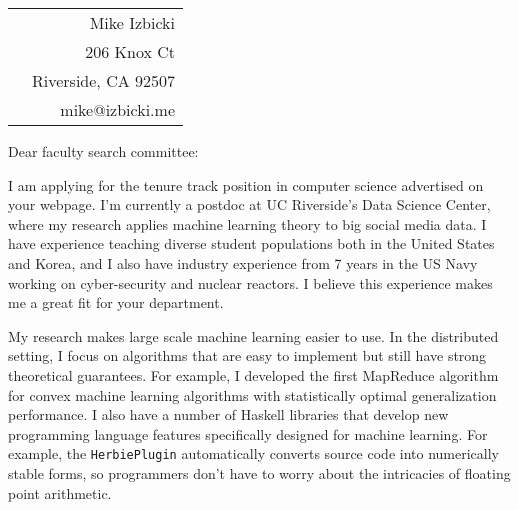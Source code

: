 \documentclass[12pt]{article}
\begin{document}
\noindent
\hspace{-0.13in}
\begin{tabularx}{1.03\textwidth}{Xr}
 & Mike Izbicki \\
 & 206 Knox Ct\\
 & Riverside, CA 92507\\
 & mike@izbicki.me\\
\end{tabularx}

\vspace{0.2in}

\setlength{\parskip}{15pt plus4mm minus3mm}

\noindent
Dear faculty search committee:

\noindent
I am applying for the tenure track position in computer science advertised on your webpage.
I'm currently a postdoc at UC Riverside's Data Science Center,
where my research applies machine learning theory to big social media data.
I have experience teaching diverse student populations both in the United States and Korea,
and I also have industry experience from 7 years in the US Navy working on cyber-security and nuclear reactors.
I believe this experience makes me a great fit for your department.

\noindent
My research makes large scale machine learning easier to use.
In the distributed setting, I focus on algorithms that are easy to implement but still have strong theoretical guarantees.
For example, I developed the first MapReduce algorithm for convex machine learning algorithms with statistically optimal generalization performance.
I also have a number of Haskell libraries that develop new programming language features specifically designed for machine learning.
For example, the \texttt{HerbiePlugin} automatically converts source code into numerically stable forms,
so programmers don't have to worry about the intricacies of floating point arithmetic.
\end{document}
